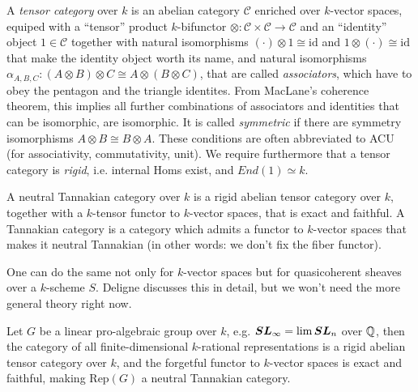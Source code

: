 \begin{defn}
 A \emph{tensor category} over $k$ is an abelian category $\mathcal{C}$ enriched over $k$-vector spaces, equiped with a ``tensor'' product $k$-bifunctor $\otimes : \mathcal{C} \times \mathcal{C} \to \mathcal{C}$ and an ``identity'' object $1 \in \mathcal{C}$ together with natural isomorphisms $(\cdot) \otimes 1 \cong \mathrm{id}$ and $1 \otimes (\cdot) \cong \mathrm{id}$ that make the identity object worth its name, and natural isomorphisms $\alpha_{A,B,C} : (A \otimes B) \otimes C \cong A \otimes (B \otimes C)$, that are called \emph{associators}, which have to obey the pentagon and the triangle identites. From MacLane's coherence theorem, this implies all further combinations of associators and identities that can be isomorphic, are isomorphic. It is called \emph{symmetric} if there are symmetry isomorphisms $A \otimes B \cong B \otimes A$. These conditions are often abbreviated to ACU (for associativity, commutativity, unit). We require furthermore that a tensor category is \emph{rigid}, i.e. internal Homs exist, and 
$End(1)\simeq k$.

 A neutral Tannakian category over $k$ is a rigid abelian tensor category over $k$, together with a $k$-tensor functor to $k$-vector spaces, that is exact and faithful. A Tannakian category is a category which admits a functor to $k$-vector spaces that makes it neutral Tannakian (in other words: we don't fix the fiber functor).
\end{defn}

One can do the same not only for $k$-vector spaces but for quasicoherent sheaves over a $k$-scheme $S$. Deligne discusses this in detail, but we won't need the more general theory right now.

\begin{exam}
 Let $G$ be a linear pro-algebraic group over $k$, e.g. $\boldsymbol{SL}_{\infty} = \lim \boldsymbol{SL}_n$ over $\mathbb{Q}$, then the category of all finite-dimensional $k$-rational representations is a rigid abelian tensor category over $k$,
 and the forgetful functor to $k$-vector spaces is exact and faithful, making $\mathrm{Rep}(G)$ a neutral Tannakian category.
\end{exam}

